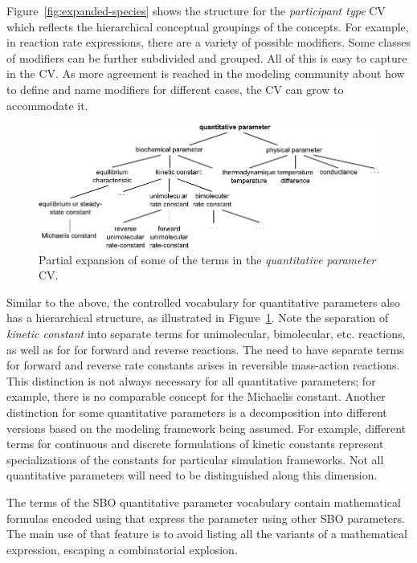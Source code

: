 Figure~\ref{fig:expanded-species} shows the structure
for the \emph{participant type} CV which reflects the hierarchical
conceptual groupings of the concepts. For example, in reaction
rate expressions, there are a variety of possible modifiers.  Some
classes of modifiers can be further subdivided and grouped.  All
of this is easy to capture in the CV.  As more agreement is
reached in the modeling community about how to define and name
modifiers for different cases, the CV can grow to accommodate it.

\begin{figure}[tbh]
  \vspace*{2ex}
  \centering
  \includegraphics[scale = 0.9]{figs/sbo-quantitative-parameter}
  \caption{Partial expansion of some of the terms in the \emph{quantitative
      parameter} CV.}
  \label{fig:expanded-parameter}
\end{figure}

Similar to the above, the controlled vocabulary for quantitative
parameters also has a hierarchical structure, as illustrated in
Figure~\ref{fig:expanded-parameter}.  Note the separation of
\emph{kinetic constant} into separate terms for unimolecular,
bimolecular, etc. reactions, as well as for for forward and
reverse reactions.  The need to have separate terms for forward
and reverse rate constants arises in reversible mass-action
reactions.  This distinction is not always necessary for all
quantitative parameters; for example, there is no comparable
concept for the Michaelis constant.  Another distinction for some
quantitative parameters is a decomposition into different versions
based on the modeling framework being assumed.  For example,
different terms for continuous and discrete formulations of
kinetic constants represent specializations of the constants for
particular simulation frameworks.  Not all quantitative parameters
will need to be distinguished along this dimension.

The terms of the SBO quantitative parameter vocabulary contain mathematical formulas encoded using \mathmltwo that express the parameter using other SBO parameters. The main use of that feature is to avoid listing all the variants of a mathematical expression, escaping a combinatorial explosion.

